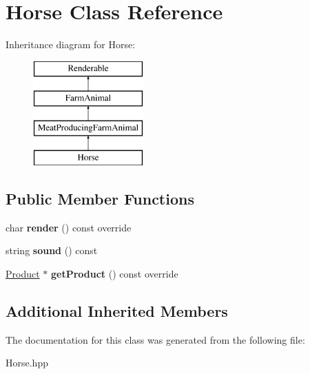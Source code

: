 \hypertarget{class_horse}{}\section{Horse Class Reference}
\label{class_horse}
Inheritance diagram for Horse\+:\begin{figure}[H]
\begin{center}
\leavevmode
\includegraphics[height=4.000000cm]{class_horse}
\end{center}
\end{figure}
\subsection*{Public Member Functions}
\begin{DoxyCompactItemize}
\item 
\mbox{\label{class_horse_aa0d9cc201fa63963321caf542d5f5cc5}} 
char {\bfseries render} () const override
\item 
\mbox{\label{class_horse_ad3af519f8ea509ca4f021fd9fe5f534c}} 
string {\bfseries sound} () const
\item 
\mbox{\label{class_horse_a9a4fad1cdab754ab66fc869da141d623}} 
\mbox{\hyperlink{class_product}{Product}} $\ast$ {\bfseries get\+Product} () const override
\end{DoxyCompactItemize}
\subsection*{Additional Inherited Members}


The documentation for this class was generated from the following file\+:\begin{DoxyCompactItemize}
\item 
Horse.\+hpp\end{DoxyCompactItemize}
